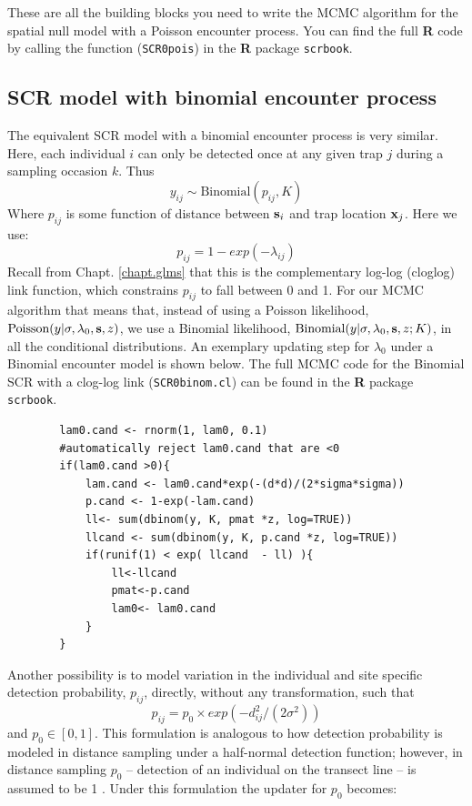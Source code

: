 These are all the building blocks you need to write the MCMC algorithm
for the spatial null model with a Poisson encounter process.  You can
find the full {\bf R} code by calling the function (\mbox{\tt SCR0pois}) in the {\bf R} package 
\mbox{\tt scrbook}.

\subsection{SCR model with binomial encounter process}
The equivalent SCR model with a binomial encounter process is very
similar. Here, each individual $i$ can only be detected once at any
given trap $j$ during a sampling occasion $k$.  Thus
\[
y_{ij} \sim \mbox{Binomial} (p_{ij}, K)
\]
Where $p_{ij}$ is some function of distance between ${\bf s}_{i}$ and trap location ${\bf x}_{j}$. Here we use:
\[
p_{ij}=1-exp(-\lambda_{ij})
\]
Recall from Chapt. \ref{chapt.glms} that this is the complementary log-log (cloglog) link function, which constrains $p_{ij}$ 
to fall between 0 and 1.
For our MCMC algorithm that means that, instead of using a Poisson 
likelihood, $\mbox{Poisson}(y|\sigma,\lambda_0,{\bf s},z)$, we use a 
Binomial likelihood, $\mbox{Binomial}(y| \sigma,\lambda_0,{\bf s},z; K)$, 
in all the conditional distributions. An exemplary updating step for $\lambda_0$ under a Binomial encounter model is shown below. 
The full MCMC code for the Binomial SCR with a clog-log link (\mbox{\tt SCR0binom.cl}) 
can be found in the {\bf R} package \mbox{\tt scrbook}.

\begin{verbatim}
        lam0.cand <- rnorm(1, lam0, 0.1)
        #automatically reject lam0.cand that are <0
        if(lam0.cand >0){   
            lam.cand <- lam0.cand*exp(-(d*d)/(2*sigma*sigma))
            p.cand <- 1-exp(-lam.cand)
            ll<- sum(dbinom(y, K, pmat *z, log=TRUE))  
            llcand <- sum(dbinom(y, K, p.cand *z, log=TRUE))
            if(runif(1) < exp( llcand  - ll) ){
                ll<-llcand
                pmat<-p.cand
                lam0<- lam0.cand
            }
        }
\end{verbatim}

Another possibility is to model variation in the individual and site 
specific detection probability,  $p_{ij}$, directly, without any 
transformation, such that
\[
p_{ij} = p_0 \times exp(-d_{ij}^2/(2\sigma^2))
\]
and $p_0 \in [0,1]$.
This formulation is analogous to how detection probability is modeled 
in distance sampling under a half-normal detection function; however, 
in distance sampling $p_0$ -- detection of an individual on the transect 
line -- is assumed to be 1 \citep{buckland_etal:2001}. Under this 
formulation the updater for $p_0$ becomes:

